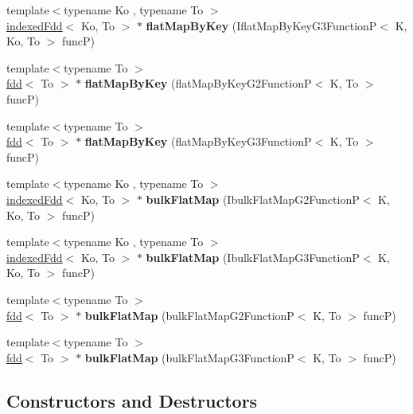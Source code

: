 \begin{DoxyCompactItemize}
\item 
{\footnotesize template$<$typename Ko , typename To $>$ }\\\hyperlink{classfaster_1_1indexedFdd}{indexed\+Fdd}$<$ Ko, To $>$ $\ast$ {\bfseries flat\+Map\+By\+Key} (Iflat\+Map\+By\+Key\+G3\+FunctionP$<$ K, Ko, To $>$ funcP)
\item 
{\footnotesize template$<$typename To $>$ }\\\hyperlink{classfaster_1_1fdd}{fdd}$<$ To $>$ $\ast$ {\bfseries flat\+Map\+By\+Key} (flat\+Map\+By\+Key\+G2\+FunctionP$<$ K, To $>$ funcP)
\item 
{\footnotesize template$<$typename To $>$ }\\\hyperlink{classfaster_1_1fdd}{fdd}$<$ To $>$ $\ast$ {\bfseries flat\+Map\+By\+Key} (flat\+Map\+By\+Key\+G3\+FunctionP$<$ K, To $>$ funcP)
\item 
{\footnotesize template$<$typename Ko , typename To $>$ }\\\hyperlink{classfaster_1_1indexedFdd}{indexed\+Fdd}$<$ Ko, To $>$ $\ast$ {\bfseries bulk\+Flat\+Map} (Ibulk\+Flat\+Map\+G2\+FunctionP$<$ K, Ko, To $>$ funcP)
\item 
{\footnotesize template$<$typename Ko , typename To $>$ }\\\hyperlink{classfaster_1_1indexedFdd}{indexed\+Fdd}$<$ Ko, To $>$ $\ast$ {\bfseries bulk\+Flat\+Map} (Ibulk\+Flat\+Map\+G3\+FunctionP$<$ K, Ko, To $>$ funcP)
\item 
{\footnotesize template$<$typename To $>$ }\\\hyperlink{classfaster_1_1fdd}{fdd}$<$ To $>$ $\ast$ {\bfseries bulk\+Flat\+Map} (bulk\+Flat\+Map\+G2\+FunctionP$<$ K, To $>$ funcP)
\item 
{\footnotesize template$<$typename To $>$ }\\\hyperlink{classfaster_1_1fdd}{fdd}$<$ To $>$ $\ast$ {\bfseries bulk\+Flat\+Map} (bulk\+Flat\+Map\+G3\+FunctionP$<$ K, To $>$ funcP)
\end{DoxyCompactItemize}


\subsection{Constructors and Destructors}
\hypertarget{classfaster_1_1groupedFdd_a3e057f8351843ebf4b2875d3bb763ccb}{}\label{classfaster_1_1groupedFdd_a3e057f8351843ebf4b2875d3bb763ccb} 
